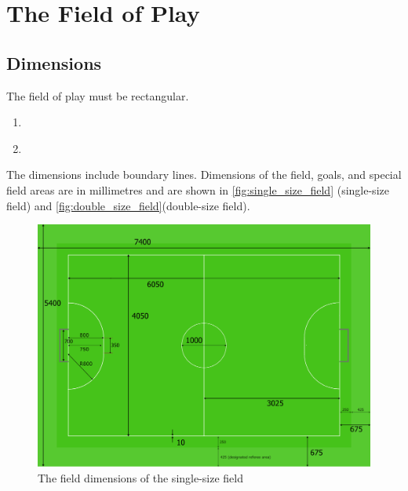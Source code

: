 \section{The Field of Play}\label{sec:field-of-play}

\subsection{Dimensions}
The field of play must be rectangular.
\begin{enumerate}
\item \textbf{}
\item \textbf{}
\end{enumerate}
The dimensions include boundary lines.
Dimensions of the field, goals, and special field areas are in millimetres and
are shown in \autoref{fig:single_size_field} (single-size field) and
\autoref{fig:double_size_field}(double-size field).

\begin{figure}[ht] %
  \centering
  \includegraphics[width=0.8\columnwidth]{img/field_2012_drawing.png}
  \caption{The field dimensions of the single-size field}
  \label{fig:single_size_field}
\end{figure}

